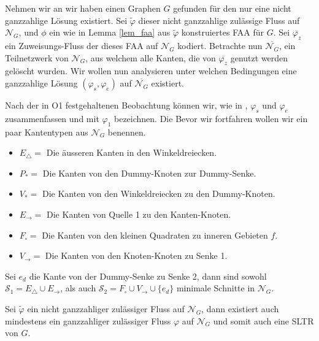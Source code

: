 Nehmen wir an wir haben einen Graphen $G$ gefunden für den nur eine nicht ganzzahlige Lösung existiert. Sei $\tilde{\varphi}$ dieser nicht ganzzahlige zulässige Fluss auf $\mathcal{N}_G$, und $\phi$ ein wie in Lemma \ref{lem_faa} aus $\tilde{\varphi}$ konstruiertes FAA für $G$. Sei $\overline{\varphi_z}$ ein Zuweisungs-Fluss der dieses FAA auf $\mathcal{N}_G$ kodiert. Betrachte nun $\overline{\mathcal{N}_G}$, ein Teilnetzwerk von $\mathcal{N}_G$, aus welchem alle Kanten, die von $\overline{\varphi_z}$ genutzt werden gelöscht wurden. Wir wollen nun analysieren unter welchen Bedingungen eine ganzzahlige Lösung $(\varphi_s,\varphi_e)$ auf $\overline{\mathcal{N}_G}$ existiert.

Nach der in O1 festgehaltenen Beobachtung können wir, wie in \cite{af15}, $\varphi_s$ und $\varphi_e$ zusammenfassen und mit $\varphi_1$ bezeichnen. Die Bevor wir fortfahren wollen wir ein paar Kantentypen aus $\mathcal{N}_G$ benennen.

\begin{itemize}
\item $E_\triangle = $ Die äusseren Kanten in den Winkeldreiecken.
\item $P_* =$ Die Kanten von den Dummy-Knoten zur Dummy-Senke.
\item $V_{*} = $ Die Kanten von den Winkeldreiecken zu den Dummy-Knoten.
\item $E_{\to} = $ Die Kanten von Quelle 1 zu den Kanten-Knoten.
\item $F_\square = $ Die Kanten von den kleinen Quadraten zu inneren Gebieten $f$.
\item $V_{\to} = $ Die Kanten von den Knoten-Knoten zu Senke 1.
\end{itemize}

Sei $e_{d}$ die Kante von der Dummy-Senke zu Senke 2, dann sind sowohl $\mathcal{S}_1 = E_\triangle \cup E_{\to}$, als auch $\mathcal{S}_2 = F_\square \cup V_{\to} \cup \{e_{d}\}$ minimale Schnitte in $\mathcal{N}_G$.

\begin{lemma}
Sei $\tilde{\varphi}$ ein nicht ganzzahliger zulässiger Fluss auf $\mathcal{N}_G$, dann existiert auch mindestens ein ganzzahliger zulässiger Fluss $\varphi$ auf $\mathcal{N}_G$ und somit auch eine SLTR von $G$.
\end{lemma}

